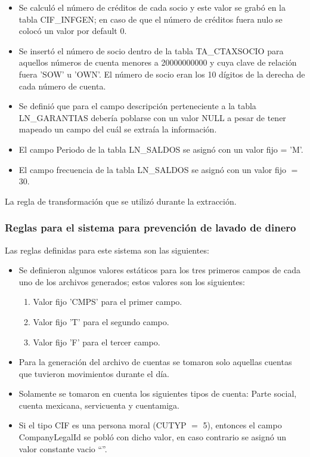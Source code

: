 \documentclass[a4paper,openright,12pt]{book}
\begin{document}
\begin{itemize}
\item Se calculó el número de créditos de cada socio y este valor se grabó en
  la tabla CIF\_INFGEN; en caso de que el número de créditos fuera nulo se
  colocó un valor por default 0.

\item Se insertó el número de socio dentro de la tabla TA\_CTAXSOCIO para
  aquellos números de cuenta menores a 20000000000 y cuya clave de relación
  fuera 'SOW' u 'OWN'. El número de socio eran los 10 dígitos de la derecha de
  cada número de cuenta.

\item Se definió que para el campo descripción perteneciente a la tabla
  LN\_GARANTIAS debería poblarse con un valor NULL a pesar de tener mapeado un
  campo del cuál se extraía la información.

\item El campo Periodo de la tabla LN\_SALDOS se asignó con un valor fijo =
  'M'.

\item El campo frecuencia de la tabla LN\_SALDOS se asignó con un valor fijo
  $=$ 30.

\end{itemize}

La regla de transformación que se utilizó durante la extracción.

\subsubsection{Reglas para el sistema para prevención de lavado de dinero}

Las reglas definidas para este sistema son las siguientes:

\begin{itemize}
\item Se definieron algunos valores estáticos para los tres primeros campos de
  cada uno de los archivos generados; estos valores son los siguientes:
\begin{enumerate}
\item Valor fijo 'CMPS' para el primer campo.
\item Valor fijo 'T' para el segundo campo.
\item Valor fijo 'F' para el tercer campo.
\end{enumerate}
\item Para la generación del archivo de cuentas se tomaron solo aquellas
  cuentas que tuvieron movimientos durante el día.
\item Solamente se tomaron en cuenta los siguientes tipos de cuenta: Parte
  social, cuenta mexicana, servicuenta y cuentamiga.
\item Si el tipo CIF es una persona moral (CUTYP $=$ 5), entonces el campo
  CompanyLegalId se pobló con dicho valor, en caso contrario se asignó un valor
  constante vacio ``''.
\end{itemize}
\end{document}
